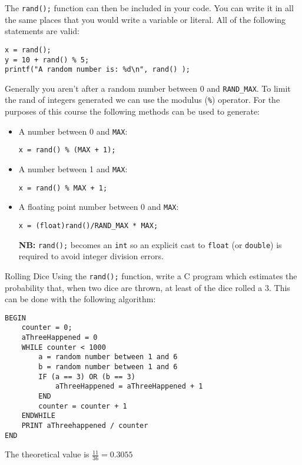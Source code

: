\documentclass{lab}
\begin{document}
The \texttt{rand();} function can then be included in your code. You can write it in all the same places that you would write a variable or literal. All of the following statements are valid:

\begin{lstlisting}[style=CStyle]
x = rand();
y = 10 + rand() % 5;
printf("A random number is: %d\n", rand() );
\end{lstlisting}

Generally you aren't after a random number between 0 and \texttt{RAND\_MAX}. To limit the rand of integers generated we can use the modulus (\texttt{\%}) operator. For the purposes of this course the following methods can be used to generate:

\begin{itemize}
\item A number between 0 and \texttt{MAX}:
\begin{lstlisting}[style=CStyle]
x = rand() % (MAX + 1);
\end{lstlisting}

\item A number between 1 and \texttt{MAX}:
\begin{lstlisting}[style=CStyle]
x = rand() % MAX + 1;
\end{lstlisting}

\item A floating point number between 0 and \texttt{MAX}:
\begin{lstlisting}[style=CStyle]
x = (float)rand()/RAND_MAX * MAX;
\end{lstlisting}
\textbf{NB:} \texttt{rand();} becomes an \texttt{int} so an explicit cast to \texttt{float} (or \texttt{double}) is required to avoid integer division errors.

\end{itemize}

\begin{task}{Rolling Dice}{}
Using the \texttt{rand();} function, write a C program which estimates the probability that, when two dice are thrown, at least of the dice rolled a 3. This can be done with the following algorithm:
\begin{lstlisting}[style=pseudo]
BEGIN
	counter = 0;
	aThreeHappened = 0
	WHILE counter < 1000
		a = random number between 1 and 6
		b = random number between 1 and 6
		IF (a == 3) OR (b == 3)
			aThreeHappened = aThreeHappened + 1
		END
		counter = counter + 1
	ENDWHILE
	PRINT aThreehappened / counter
END
\end{lstlisting}

The theoretical value is $\frac{11}{36} = 0.3055$
\end{task}
\end{document}
